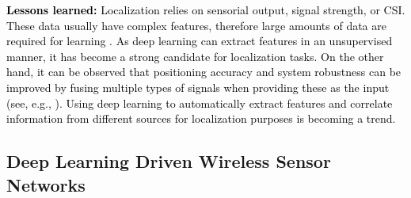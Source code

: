 \documentclass[journal,comsoc,letter]{IEEEtran}
\newcommand{\edit}[1]{\textcolor{black}{#1}}
\newcommand{\rev}[1]{\textcolor{black}{#1}}
\begin{document}
\noindent\edit{\textbf{Lessons learned:} Localization relies on sensorial output, signal strength, or CSI.  These data usually have complex features, therefore large amounts of data are required for learning \cite{nowicki2017low}. As deep learning can extract features in an unsupervised manner, it has become a strong candidate for localization tasks.} \rev{On the other hand, it can be observed that positioning accuracy and system robustness can be improved by fusing multiple types of signals when providing these as the input (see, e.g., \cite{zhang2017deeppositioning}). Using deep learning to automatically extract features and correlate information from different sources for localization purposes is becoming a trend.}

\subsection{Deep Learning Driven Wireless Sensor Networks}
\end{document}
